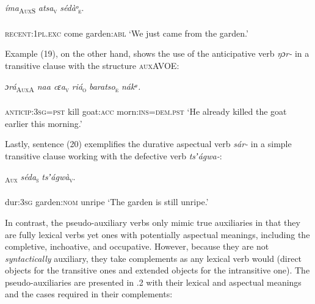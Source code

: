\ea\label{ex:}
\textit{íma}\textsc{\textsubscript{AuxS}}   \textit{atsa}\textsc{\textsubscript{v}}\textit{     sédàᵒ}\textsc{\textsubscript{e}}. \\
    \\
\textsc{recent:1pl.exc}   come     garden:\textsc{abl}
\glt ‘We just came from the garden.’ 
\z


Example (19), on the other hand, shows the use of the anticipative verb \textit{ŋɔr-} in a transitive clause with the structure \textsc{auxAVOE}:



\ea\label{ex:}
\textit{ɔrá}\textsc{\textsubscript{AuxA}}\textit{ naa   cɛa}\textsc{\textsubscript{v}}\textit{   riá}\textsc{\textsubscript{o}}\textit{        baratso}\textsc{\textsubscript{e}}\textit{ nákᵃ.} \\
    \\
\textsc{anticip:3sg=pst}   kill   goat:\textsc{acc} morn:\textsc{ins=dem.pst}
\glt ‘He already killed the goat earlier this morning.’ 
\z


Lastly, sentence (20) exemplifies the durative aspectual verb \textit{sár-} in a simple transitive clause working with the defective verb \textit{tsʼágwa-}:



\ea\label{ex:}
\textsc{\textsubscript{Aux}}\textit{  séda}\textsc{\textsubscript{s}}\textit{     tsʼágwà}\textsc{\textsubscript{v}}. \\
    \\
dur:\textsc{3sg}   garden:\textsc{nom}   unripe
\glt ‘The garden is still unripe.’ 
\z


In contrast, the pseudo-auxiliary verbs only mimic true auxiliaries in that they are fully lexical verbs yet ones with potentially aspectual meanings, including the completive, inchoative, and occupative. However, because they are not \textit{syntactically} auxiliary, they take complements as any lexical verb would (direct objects for the transitive ones and extended objects for the intransitive one). The pseudo-auxiliaries are presented in .2 with their lexical and aspectual meanings and the cases required in their complements:


